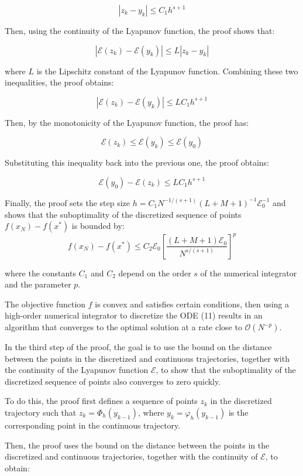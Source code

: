 \begin{enumerate}
$$
|z_k - y_k| \le C_1 h^{s+1}
$$

    Then, using the continuity of the Lyapunov function, the proof shows that:

$$
|\mathcal{E}(z_k) - \mathcal{E}(y_k)| \le L |z_k - y_k|
$$

    where $L$ is the Lipschitz constant of the Lyapunov function. Combining these two inequalities, the proof obtains:

$$
|\mathcal{E}(z_k) - \mathcal{E}(y_k)| \le L C_1 h^{s+1}
$$

    Then, by the monotonicity of the Lyapunov function, the proof has:

$$
\mathcal{E}(z_k) \le \mathcal{E}(y_k) \le \mathcal{E}(y_0)
$$

    Substituting this inequality back into the previous one, the proof obtains:

$$
\mathcal{E}(y_0) - \mathcal{E}(z_k) \le L C_1 h^{s+1}
$$

    Finally, the proof sets the step size $h = C_1 N^{-1/(s+1)}(L+M+1)^{-1} \mathcal{E}_0^{-1}$ and shows that the suboptimality of the discretized sequence of points $f(x_N) - f(x^*)$ is bounded by: 
$$
f(x_N) - f(x^*) \le C_2 \mathcal{E}_0 \left[\frac{(L+M+1) \mathcal{E}_0}{N^{s/(s+1)}}\right]^p
$$

    where the constants $C_1$ and $C_2$ depend on the order $s$ of the numerical integrator and the parameter $p$.

     The objective function $f$ is convex and satisfies certain conditions, then using a high-order numerical integrator to discretize the ODE (11) results in an algorithm that converges to the optimal solution at a rate close to $\mathcal{O}(N^{-p})$.

    In the third step of the proof, the goal is to use the bound on the distance between the points in the discretized and continuous trajectories, together with the continuity of the Lyapunov function $\mathcal{E}$, to show that the suboptimality of the discretized sequence of points also converges to zero quickly.
    
    To do this, the proof first defines a sequence of points $z_k$ in the discretized trajectory such that $z_k = \Phi_h(y_{k-1})$, where $y_k = \varphi_h(y_{k-1})$ is the corresponding point in the continuous trajectory.

    Then, the proof uses the bound on the distance between the points in the discretized and continuous trajectories, together with the continuity of $\mathcal{E}$, to obtain:


\end{enumerate}
